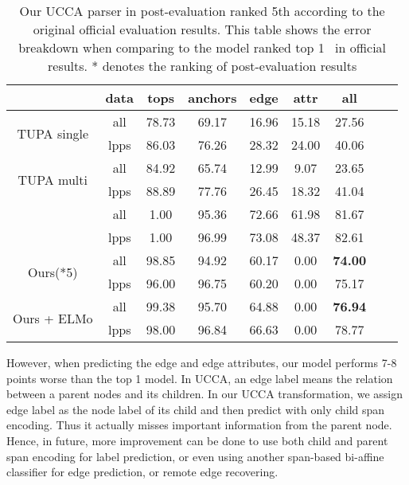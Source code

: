 \begin{table}[!h]
\small
\centering
\setlength{\tabcolsep}{2.5pt}

\begin{tabular}{ccccccccc}
\toprule
                              & data & tops  & anchors & edge  & attr  & all   \\ \hline
\multirow{2}{*}{ TUPA
single }                      & all  & 78.73 & 69.17   & 16.96 & 15.18 & 27.56 \\
                              & lpps & 86.03 & 76.26   & 28.32 & 24.00 & 40.06 \\
\multirow{2}{*}{ TUPA
multi }                       & all  & 84.92 & 65.74   & 12.99 &  9.07 & 23.65 \\
                              & lpps & 88.89 & 77.76   & 26.45 & 18.32 & 41.04 \\
\multirow{2}{*}{\cite{Che:Dou:Xu:19}}       & all  & 1.00  & 95.36   & 72.66 & 61.98 & 81.67 \\
                              & lpps & 1.00  & 96.99   & 73.08 & 48.37 & 82.61 \\ \hline
\multirow{2}{*}{ Ours(*5)}    & all  & 98.85 & 94.92   & 60.17 & 0.00  & {\bf 74.00} \\
                              & lpps & 96.00 & 96.75   & 60.20 & 0.00  & 75.17 \\
\multirow{2}{*}{ Ours + ELMo} & all  & 99.38 & 95.70   & 64.88 & 0.00  & {\bf 76.94} \\
                              & lpps & 98.00 & 96.84   & 66.63 & 0.00  & 78.77 \\ \bottomrule
\end{tabular}
\caption{\label{tbl:results_ucca} Our UCCA parser in post-evaluation ranked 5th according to the original official evaluation results. This table shows the error breakdown when comparing to the model ranked top 1~\cite{Che:Dou:Xu:19} in official results. * denotes the ranking of post-evaluation results }
\end{table}

However, when predicting the edge and edge attributes, our model
performs 7-8 points worse than the top 1 model. In UCCA, an edge label
means the relation between a parent nodes and its children. In our
UCCA transformation, we assign edge label as the node label of its
child and then predict with only child span encoding. Thus it actually
misses important information from the parent node. Hence, in future,
more improvement can be done to use both child and parent span
encoding for label prediction, or even using another span-based
bi-affine classifier for edge prediction, or remote edge recovering.

